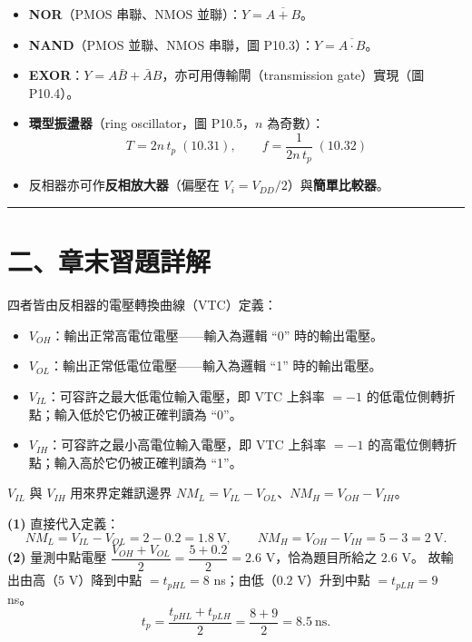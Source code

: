 \documentclass[12pt]{article}
\begin{document}
\begin{keybox}
\begin{itemize}[leftmargin=2.2em,itemsep=1pt]
  \item \textbf{NOR}（PMOS 串聯、NMOS 並聯）：$Y=\overline{A+B}$。
  \item \textbf{NAND}（PMOS 並聯、NMOS 串聯，圖 P10.3）：$Y=\overline{A\cdot B}$。
  \item \textbf{EXOR}：$Y=A\bar B+\bar A B$，亦可用傳輸閘（transmission gate）實現（圖 P10.4）。
  \item \textbf{環型振盪器}（ring oscillator，圖 P10.5，$n$ 為奇數）：
        \[ T=2n\,t_p\;(10.31),\qquad f=\frac{1}{2n\,t_p}\;(10.32) \]
  \item 反相器亦可作\textbf{反相放大器}（偏壓在 $V_i=V_{DD}/2$）與\textbf{簡單比較器}。
\end{itemize}
\end{keybox}

\bigskip
\hrule
\vspace{0.6em}

\section*{二、章末習題詳解}

\sol 四者皆由反相器的電壓轉換曲線（VTC）定義：
\begin{itemize}[leftmargin=2.2em,itemsep=1pt]
  \item $V_{OH}$：輸出正常高電位電壓——輸入為邏輯 ``0'' 時的輸出電壓。
  \item $V_{OL}$：輸出正常低電位電壓——輸入為邏輯 ``1'' 時的輸出電壓。
  \item $V_{IL}$：可容許之最大低電位輸入電壓，即 VTC 上斜率 $=-1$ 的低電位側轉折點；輸入低於它仍被正確判讀為 ``0''。
  \item $V_{IH}$：可容許之最小高電位輸入電壓，即 VTC 上斜率 $=-1$ 的高電位側轉折點；輸入高於它仍被正確判讀為 ``1''。
\end{itemize}
$V_{IL}$ 與 $V_{IH}$ 用來界定雜訊邊界 $NM_L=V_{IL}-V_{OL}$、$NM_H=V_{OH}-V_{IH}$。

\sol
\textbf{(1)} 直接代入定義：
\[ NM_L=V_{IL}-V_{OL}=2-0.2=1.8\ \text{V},\qquad
   NM_H=V_{OH}-V_{IH}=5-3=2\ \text{V}. \]
\textbf{(2)} 量測中點電壓 $\dfrac{V_{OH}+V_{OL}}{2}=\dfrac{5+0.2}{2}=2.6$ V，恰為題目所給之 $2.6$ V。
故輸出由高（$5$ V）降到中點 $=t_{pHL}=8$ ns；由低（$0.2$ V）升到中點 $=t_{pLH}=9$ ns。
\[ t_p=\frac{t_{pHL}+t_{pLH}}{2}=\frac{8+9}{2}=8.5\ \text{ns}. \]
\end{document}
